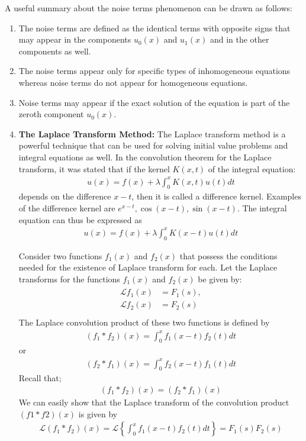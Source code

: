 \documentclass[11pt]{report}
\newcommand{\Laplace}{\mathcal{L}}
\newcommand{\sps}{\\[0.2cm]}
\newcommand{\NI}{\noindent}
\begin{document}
	\NI A useful summary about the noise terms phenomenon can be drawn as follows:
	\begin{enumerate}
		\item The noise terms are defined as the identical terms with opposite signs that may appear in the components $u_0(x)$ and $u_1(x)$ and in the other components as well.
		
		\item The noise terms appear only for specific types of inhomogeneous equations whereas noise terms do not appear for homogeneous equations.
		
		\item Noise terms may appear if the exact solution of the equation is part of the zeroth component $u_0(x)$.
		
		\item \textbf{The Laplace Transform Method:}
		The Laplace transform method is a powerful technique that can be used for solving initial value problems and integral equations as well. In the convolution theorem for the Laplace transform, it was stated that if the kernel $K(x,t)$ of the integral equation: 
		\begin{eqnarray*}
			u(x) = f(x) + \lambda\int_{0}^{x} K(x,t) u(t) dt
		\end{eqnarray*}
		depends on the difference $x-t$, then it is called a difference kernel. Examples of the difference kernel are $e^{x-t},\cos(x - t), \sin(x - t)$. The integral equation can thus be expressed as
		\begin{eqnarray*}
			u(x) = f(x) + \lambda\int_{0}^{x} K(x - t) u(t) dt
		\end{eqnarray*}
		
		\NI Consider two functions $f_1(x)$ and $f_2(x)$ that possess the conditions needed for the existence of Laplace transform for each. Let the Laplace transforms for the functions $f_1(x)$ and $f_2(x)$ be given by: \\
		\begin{eqnarray*}
			\begin{split}
				\Laplace{f_1(x)} &= F_1(s),\sps
				\Laplace{f_2(x)} &= F_2(s)\sps
			\end{split}
		\end{eqnarray*}	
		The Laplace convolution product of these two functions is defined by
		\begin{eqnarray*}
			(f_1 * f_2)(x) =\int_{0}^{x} f_1(x - t) f_2(t) dt
		\end{eqnarray*}
		or
		\begin{eqnarray*}
			(f_2 * f_1)(x) =\int_{0}^{x} f_2(x - t) f_1(t) dt
		\end{eqnarray*}
		Recall that;
		\begin{eqnarray*}
			(f_1 * f_2)(x) = (f_2 * f_1)(x)
		\end{eqnarray*}
		We can easily show that the Laplace transform of the convolution product $(f1 * f2)(x)$ is given by
		\begin{eqnarray*}
			\Laplace{(f_1 * f_2)(x)} = \Laplace\left\{\int_{0}^{x} f_1(x - t) f_2(t) dt\right\} = F_1(s)F_2(s)
		\end{eqnarray*}
	\end{enumerate}
	
\end{document}

